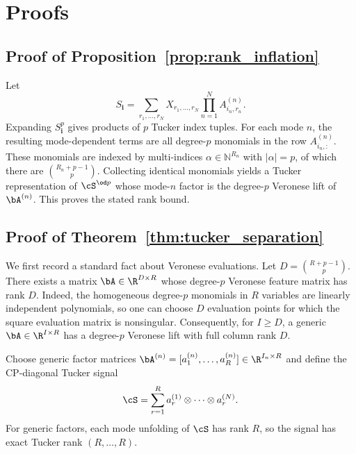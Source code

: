 \section{Proofs}
\label{app:proofs}

\subsection{Proof of Proposition~\ref{prop:rank_inflation}}

Let
\[
  S_{\mathbf{i}}
  =
  \sum_{r_1,\ldots,r_N}
  X_{r_1,\ldots,r_N}
  \prod_{n=1}^{N}A^{(n)}_{i_n,r_n}.
\]
Expanding $S_{\mathbf{i}}^p$ gives products of $p$ Tucker index tuples. For
each mode $n$, the resulting mode-dependent terms are all degree-$p$ monomials
in the row $A^{(n)}_{i_n,:}$. These monomials are indexed by multi-indices
$\alpha\in\mathbb{N}^{R_n}$ with $|\alpha|=p$, of which there are
$\binom{R_n+p-1}{p}$. Collecting identical monomials yields a Tucker
representation of $\cS^{\od p}$ whose mode-$n$ factor is the degree-$p$
Veronese lift of $\bA^{(n)}$. This proves the stated rank bound.

\subsection{Proof of Theorem~\ref{thm:tucker_separation}}

We first record a standard fact about Veronese evaluations. Let
\(D=\binom{R+p-1}{p}\). There exists a matrix \(\bA\in\R^{D\times R}\) whose
degree-\(p\) Veronese feature matrix has rank \(D\). Indeed, the homogeneous
degree-\(p\) monomials in \(R\) variables are linearly independent
polynomials, so one can choose \(D\) evaluation points for which the square
evaluation matrix is nonsingular. Consequently, for \(I\ge D\), a generic
\(\bA\in\R^{I\times R}\) has a degree-\(p\) Veronese lift with full column
rank \(D\).

Choose generic factor matrices
\(\bA^{(n)}=[a_1^{(n)},\ldots,a_R^{(n)}]\in\R^{I_n\times R}\) and define the
CP-diagonal Tucker signal
\[
  \cS =
  \sum_{r=1}^{R} a_r^{(1)}\otimes\cdots\otimes a_r^{(N)} .
\]
For generic factors, each mode unfolding of \(\cS\) has rank \(R\), so the
signal has exact Tucker rank \((R,\ldots,R)\).

